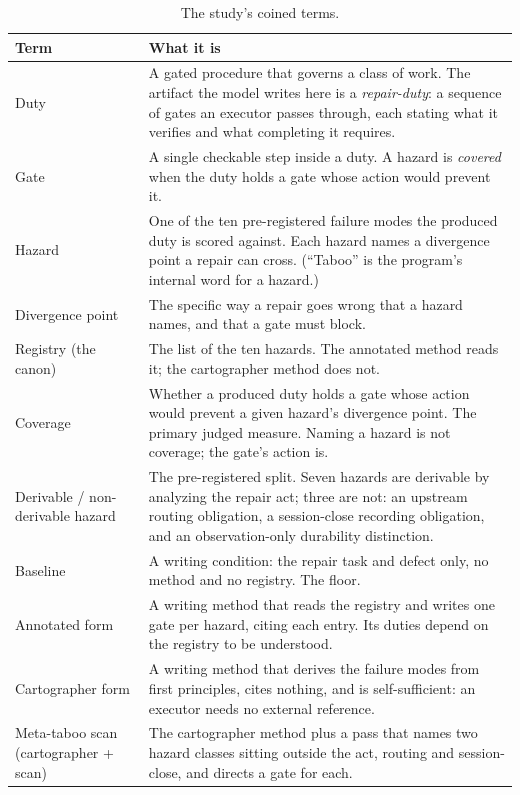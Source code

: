 \documentclass[11pt,a4paper]{article}
\begin{document}
\begin{table}[h]
\centering
\small
\caption{The study's coined terms.}
\label{tab:terms}
\begin{tabular}{@{}>{\raggedright\arraybackslash}p{3.7cm}>{\raggedright\arraybackslash}p{9.1cm}@{}}
\toprule
Term & What it is \\
\midrule
Duty & A gated procedure that governs a class of work. The artifact the model writes here is a \emph{repair-duty}: a sequence of gates an executor passes through, each stating what it verifies and what completing it requires. \\
Gate & A single checkable step inside a duty. A hazard is \emph{covered} when the duty holds a gate whose action would prevent it. \\
Hazard & One of the ten pre-registered failure modes the produced duty is scored against. Each hazard names a divergence point a repair can cross. (``Taboo'' is the program's internal word for a hazard.) \\
Divergence point & The specific way a repair goes wrong that a hazard names, and that a gate must block. \\
Registry (the canon) & The list of the ten hazards. The annotated method reads it; the cartographer method does not. \\
Coverage & Whether a produced duty holds a gate whose action would prevent a given hazard's divergence point. The primary judged measure. Naming a hazard is not coverage; the gate's action is. \\
Derivable / non-derivable hazard & The pre-registered split. Seven hazards are derivable by analyzing the repair act; three are not: an upstream routing obligation, a session-close recording obligation, and an observation-only durability distinction. \\
Baseline & A writing condition: the repair task and defect only, no method and no registry. The floor. \\
Annotated form & A writing method that reads the registry and writes one gate per hazard, citing each entry. Its duties depend on the registry to be understood. \\
Cartographer form & A writing method that derives the failure modes from first principles, cites nothing, and is self-sufficient: an executor needs no external reference. \\
Meta-taboo scan (cartographer + scan) & The cartographer method plus a pass that names two hazard classes sitting outside the act, routing and session-close, and directs a gate for each. \\
\bottomrule
\end{tabular}
\end{table}
\end{document}
